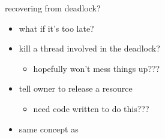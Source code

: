 \begin{frame}{recovering from deadlock?}
\begin{itemize}
\item what if it's too late?
\vspace{.5cm}
\item kill a thread involved in the deadlock?
    \begin{itemize}
    \item hopefully won't mess things up???
    \end{itemize}
\item tell owner to release a resource
    \begin{itemize}
    \item need code written to do this???
    \end{itemize}
\item same concept as 
\end{itemize}
\end{frame}

